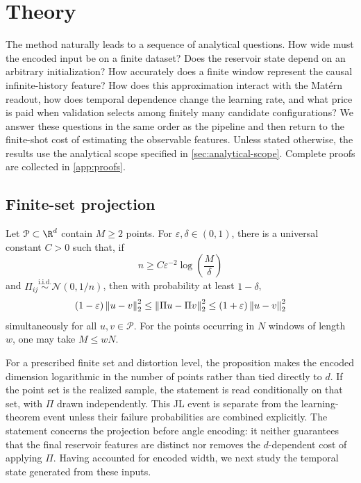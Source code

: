 \section{Theory}
\label{sec:theory}

The method naturally leads to a sequence of analytical questions. How wide
must the encoded input be on a finite dataset? Does the reservoir state depend
on an arbitrary initialization? How accurately does a finite window represent
the causal infinite-history feature? How does this approximation interact with
the Mat\'ern readout, how does temporal dependence change the learning rate,
and what price is paid when validation selects among finitely many candidate
configurations? We answer these questions in the same order as the pipeline and
then return to the finite-shot cost of estimating the observable features. Unless
stated otherwise, the results use the analytical scope specified in
\cref{sec:analytical-scope}. Complete proofs are collected in
\cref{app:proofs}.

\subsection{Finite-set projection}

\begin{proposition}
\label{prop:jl}
Let \(\mathcal P\subset\R^d\) contain \(M\geq2\) points. For
\(\varepsilon,\delta\in(0,1)\), there is a universal constant \(C>0\) such
that, if
\[
    n\geq
    C\varepsilon^{-2}\log\!\left(\frac{M}{\delta}\right)
\]
and \(\Pi_{ij}\overset{\mathrm{i.i.d.}}{\sim}\mathcal N(0,1/n)\), then with
probability at least \(1-\delta\),
\[
    (1-\varepsilon)\left\lVert u-v\right\rVert_2^2
    \leq\left\lVert\Pi u-\Pi v\right\rVert_2^2
    \leq(1+\varepsilon)\left\lVert u-v\right\rVert_2^2
\]
simultaneously for all \(u,v\in\mathcal P\). For the points occurring in
\(N\) windows of length \(w\), one may take \(M\leq wN\).
\end{proposition}

For a prescribed finite set and distortion level, the proposition makes the
encoded dimension logarithmic in the number of points rather than tied directly
to \(d\). If the point set is the realized sample, the statement is read
conditionally on that set, with \(\Pi\) drawn independently. This JL event is
separate from the learning-theorem event unless their failure probabilities are
combined explicitly. The statement concerns the projection before angle
encoding: it neither guarantees that the final reservoir features are distinct
nor removes the \(d\)-dependent cost of applying \(\Pi\). Having accounted for
encoded width, we next study the temporal state generated from these inputs.

